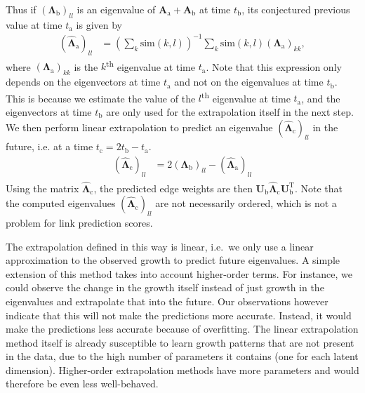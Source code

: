 \documentclass[11pt,a4paper]{book}
\begin{document}
Thus if $(\mathbf\Lambda_{\mathrm b})_{ll}$ is an eigenvalue of $\mathbf
A_{\mathrm a} + \mathbf A_{\mathrm b}$ 
at time $t_{\mathrm b}$, its conjectured previous value at time
$t_{\mathrm a}$ is given by
\begin{align*}
  (\mathbf{\hat \Lambda}_{\mathrm a})_{ll} &= 
  \left( \sum_k 
  \mathrm{sim}(k,l)
  \right)^{-1} 
  \sum_k 
  \mathrm{sim}(k,l)
  (\mathbf\Lambda_{\mathrm a})_{kk},
\end{align*}
where $(\mathbf\Lambda_{\mathrm a})_{kk}$ is the $k$\textsuperscript{th} eigenvalue 
at time $t_{\mathrm a}$.
Note that this expression only depends on the eigenvectors at time
$t_{\mathrm a}$ and not on the eigenvalues at time $t_{\mathrm b}$.
This is because we estimate the value of the $l$\textsuperscript{th}
eigenvalue at time $t_{\mathrm a}$, and the eigenvectors at time
$t_{\mathrm b}$ are only used for the extrapolation itself in the next
step. 
We then perform linear extrapolation to predict an eigenvalue
$(\mathbf{\hat\Lambda}_{\mathrm c})_{ll}$ in the future, i.e. at a time $t_{\mathrm c} =
2t_{\mathrm b} - t_{\mathrm a}$.
\begin{align}
  (\mathbf{\hat\Lambda}_{\mathrm c})_{ll} &= 2 (\mathbf\Lambda_{\mathrm
    b})_{ll} - (\mathbf{\hat\Lambda}_{\mathrm a})_{ll} 
\end{align}
Using the matrix $\mathbf{\hat\Lambda}_{\mathrm c}$,
the predicted edge weights are then $\mathbf U_{\mathrm b}^{\phantom{\mathrm I}}
\mathbf{\hat\Lambda}^{\phantom{\mathrm I}}_{\mathrm c} \mathbf U_{\mathrm b}^{\mathrm T}$.
Note that the computed eigenvalues 
$(\mathbf{\hat\Lambda}_{\mathrm c})_{ll}$ are not necessarily ordered, which is not a problem for
link prediction scores. 

The extrapolation defined in this way is linear, i.e.\ we only use a
linear approximation to the observed growth to predict future
eigenvalues.  A simple extension of this method takes into account
higher-order terms.  For instance, we could observe the change in the
growth itself instead of just growth in the eigenvalues and extrapolate
that into the future.  Our observations however 
indicate that this will not make the predictions more accurate.
Instead, it would make the predictions less accurate because of
overfitting.  The linear extrapolation method itself is already
susceptible to learn growth patterns that are not present in the data,
due to the high number of parameters it contains (one for each latent
dimension).  Higher-order extrapolation methods have more parameters and
would therefore be even less well-behaved. 
\end{document}
